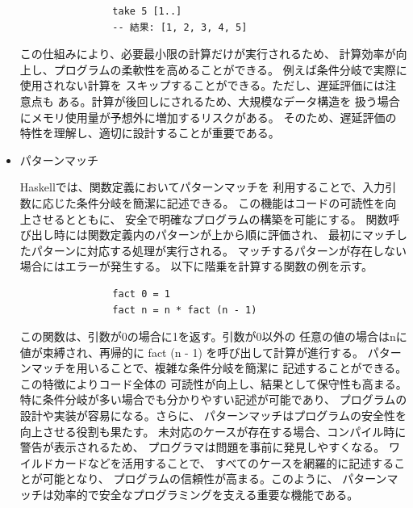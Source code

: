 \documentclass{cssspaper}
\begin{document}
\begin{itemize}
                \begin{lstlisting}
                take 5 [1..]
                -- 結果: [1, 2, 3, 4, 5]
                \end{lstlisting}

                この仕組みにより、必要最小限の計算だけが実行されるため、
                計算効率が向上し、プログラムの柔軟性を高めることができる。
                例えば条件分岐で実際に使用されない計算を
                スキップすることができる。ただし、遅延評価には注意点も
                ある。計算が後回しにされるため、大規模なデータ構造を
                扱う場合にメモリ使用量が予想外に増加するリスクがある。
                そのため、遅延評価の特性を理解し、適切に設計することが重要である。

                \item パターンマッチ
                
                Haskellでは、関数定義においてパターンマッチを
                利用することで、入力引数に応じた条件分岐を簡潔に記述できる。
                この機能はコードの可読性を向上させるとともに、
                安全で明確なプログラムの構築を可能にする。
                関数呼び出し時には関数定義内のパターンが上から順に評価され、
                最初にマッチしたパターンに対応する処理が実行される。
                マッチするパターンが存在しない場合にはエラーが発生する。
                以下に階乗を計算する関数の例を示す。

                \begin{lstlisting}
                fact 0 = 1
                fact n = n * fact (n - 1)
                \end{lstlisting}

                この関数は、引数が0の場合に1を返す。引数が0以外の
                任意の値の場合はnに値が束縛され、再帰的に
                fact (n - 1) を呼び出して計算が進行する。
                パターンマッチを用いることで、複雑な条件分岐を簡潔に
                記述することができる。この特徴によりコード全体の
                可読性が向上し、結果として保守性も高まる。
                特に条件分岐が多い場合でも分かりやすい記述が可能であり、
                プログラムの設計や実装が容易になる。さらに、
                パターンマッチはプログラムの安全性を向上させる役割も果たす。
                未対応のケースが存在する場合、コンパイル時に警告が表示されるため、
                プログラマは問題を事前に発見しやすくなる。
                ワイルドカードなどを活用することで、
                すべてのケースを網羅的に記述することが可能となり、
                プログラムの信頼性が高まる。このように、
                パターンマッチは効率的で安全なプログラミングを支える重要な機能である。


\end{itemize}
\end{document}
